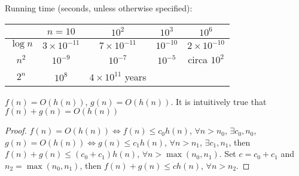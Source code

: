 Running time (seconds, unless otherwise specified):

\begin{tabular}{ccccc}
 & $n = 10$ & $10^2$ & $10^3$ & $10^6$ \\\hline
$\log n$ & $3 \times 10^{-11}$ & $7 \times 10^{-11}$ & $10^{-10}$ & $2 \times 10^{-10}$ \\\hline
$n^2$ & $10^{-9}$ & $10^{-7}$ & $10^{-5}$ & circa $10^{2}$ \\\hline
$2^n$ & $10^8$ & $4 \times 10^{11}$ years &  & 
\end{tabular}

$f(n) = O(h(n))$, $g(n) = O(h(n))$. It is intuitively true that $f(n) + g(n) = O(h(n))$

\begin{proof}
$f(n) = O(h(n)) \Leftrightarrow f(n) \leq c_0 h(n)$, $\forall n > n_0$,  $\exists c_0, n_0$, $g(n) = O(h(n)) \Leftrightarrow g(n) \leq c_1 h(n)$, $\forall n > n_1$, $\exists c_1, n_1$, then $f(n) + g(n) \leq (c_0 + c_1) h(n)$, $\forall n > \max (n_0, n_1)$. Set $c = c_0 + c_1$ and $n_2 = \max (n_0, n_1)$, then $f(n) + g(n) \leq c h(n)$, $\forall n > n_2$.
\end{proof}
